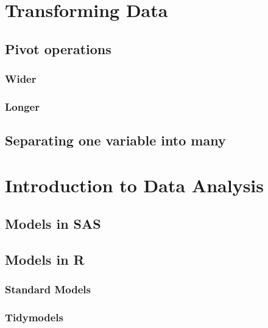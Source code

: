 \documentclass[]{book}
\begin{document}
\hypertarget{transforming-data}{%
\chapter{Transforming Data}\label{transforming-data}}

\hypertarget{pivot-operations}{%
\section{Pivot operations}\label{pivot-operations}}

\hypertarget{wider}{%
\subsection{Wider}\label{wider}}

\hypertarget{longer}{%
\subsection{Longer}\label{longer}}

\hypertarget{separating-one-variable-into-many}{%
\section{Separating one variable into many}\label{separating-one-variable-into-many}}

\hypertarget{data-analysis}{%
\chapter{Introduction to Data Analysis}\label{data-analysis}}

\hypertarget{models-in-sas}{%
\section{Models in SAS}\label{models-in-sas}}

\hypertarget{models-in-r}{%
\section{Models in R}\label{models-in-r}}

\hypertarget{standard-models}{%
\subsection{Standard Models}\label{standard-models}}

\hypertarget{tidymodels}{%
\subsection{Tidymodels}\label{tidymodels}}
\end{document}
